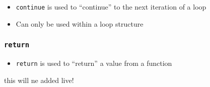 \documentclass{article}
\begin{document}
\begin{itemize}
	\item \texttt{continue} is used to ``continue'' to the next iteration of a loop
	\item Can only be used within a loop structure
\end{itemize}

\subsubsection{\texttt{return}}

\begin{itemize}
	\item \texttt{return} is used to ``return'' a value from a function
\end{itemize}

this will ne added live!
\end{document}
